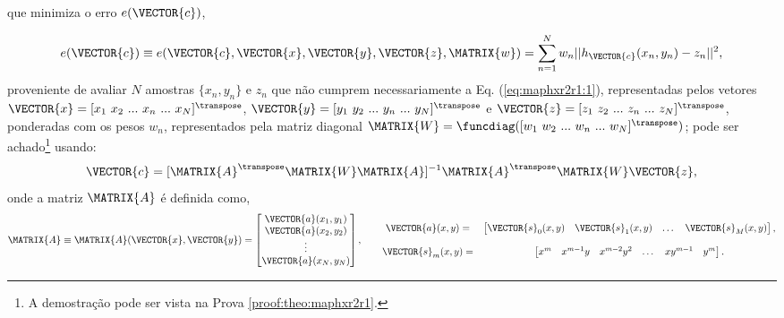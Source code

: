 \begin{theorem}
\begin{minipage}{0.6\textwidth}
que minimiza o erro $e(\VECTOR{c})$,
\end{minipage}
\begin{equation}\label{eq:maphxr2r1:2}
e(\VECTOR{c}) \equiv e(\VECTOR{c},\VECTOR{x},\VECTOR{y},\VECTOR{z},\MATRIX{w})=  \sum_{n=1}^{N} w_n||h_{\VECTOR{c}}(x_n,y_n)-z_n||^2,
\end{equation}
proveniente de avaliar $N$ amostras $\{x_n,y_n\}$ e $z_n$ que não cumprem necessariamente a Eq. (\ref{eq:maphxr2r1:1}), 
representadas pelos vetores 
$\VECTOR{x}=[x_1~ x_2~ ...~ x_n~ ...~ x_N]^{\transpose}$,
$\VECTOR{y}=[y_1~ y_2~ ...~ y_n~ ...~ y_N]^{\transpose}$ e 
$\VECTOR{z}=[z_1~ z_2~ ...~ z_n~ ...~ z_N]^{\transpose}$,
ponderadas com os pesos $w_n$, 
representados pela matriz diagonal $\MATRIX{W}=\funcdiag([w_1~ w_2~ ...~ w_n~ ...~ w_N]^{\transpose})$;
pode ser achado\footnote{A demostração pode ser vista na Prova \ref{proof:theo:maphxr2r1}.} usando:
\begin{equation}\label{eq:maphxr2r1:3}
\VECTOR{c}=[\MATRIX{A}^{\transpose}\MATRIX{W}\MATRIX{A}]^{-1}\MATRIX{A}^{\transpose}\MATRIX{W}\VECTOR{z},
\end{equation}
onde a matriz $\MATRIX{A}$ é definida como,
\begin{equation}\label{eq:maphxr2r1:4}
\MATRIX{A}\equiv\MATRIX{A}(\VECTOR{x},\VECTOR{y})=\begin{bmatrix}
\VECTOR{a}(x_1,y_1)\\
\VECTOR{a}(x_2,y_2)\\
\vdots\\
\VECTOR{a}(x_N,y_N)\\
\end{bmatrix}, \qquad
\begin{matrix}
\VECTOR{a}(x,y)= &
\begin{bmatrix}
\VECTOR{s}_{0}(x,y) & \VECTOR{s}_{1}(x,y) &  \dots  & \VECTOR{s}_{M}(x,y)
\end{bmatrix},\\
~&~\\
\VECTOR{s}_{m}(x,y)=&
\begin{bmatrix}
x^m  & x^{m-1} y  & x^{m-2} y^2    & \dots  & x y^{m-1} &  y^m 
\end{bmatrix}.
\end{matrix}
\end{equation}
\end{theorem}



